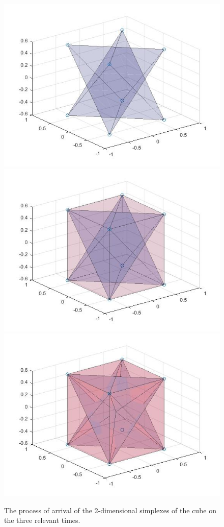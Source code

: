 \documentclass[a4paper,12pt,reqno, english]{amsart}
\theoremstyle{plain}
\theoremstyle{definition}
\begin{document}
{{\begin{figure}
	\includegraphics[scale=0.25]{FiltT0cube.jpg}
	\includegraphics[scale=0.25]{FiltT1cube.jpg}
	\includegraphics[scale=0.25]{FiltT2cube.jpg}
    \caption{The process of arrival of the 2-dimensional simplexes of the cube on the three relevant times.}
 \end{figure}
 
}}
\end{document}
